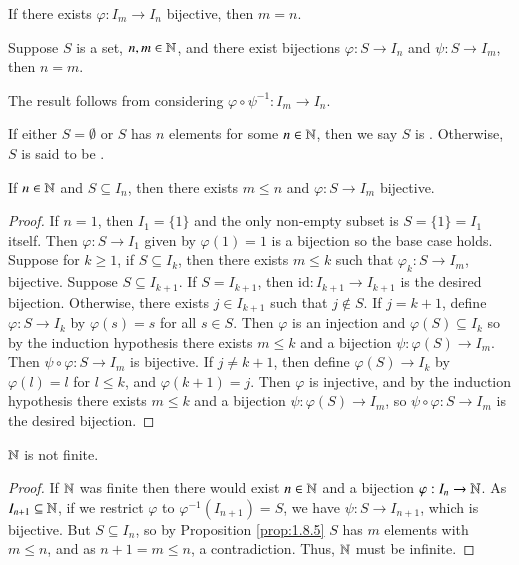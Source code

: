 \begin{subappendices}
    \begin{cor}\label{cor:1.8.3}
        If there exists $\varphi:I_m\rightarrow I_n$ bijective, then $m = n$.
    \end{cor}

    \begin{cor}\label{cor:1.8.4}
        Suppose $S$ is a set, $n,m \in \mathbb N$, and there exist bijections $\varphi:S\rightarrow I_n$ and $\psi:S\rightarrow I_m$, then $n = m$.
    \end{cor}

    The result follows from considering $\varphi\circ \psi^{-1}:I_m\rightarrow I_n$.

    \begin{defn}
        If either $S = \emptyset$ or $S$ has $n$ elements for some $n \in \mathbb N$, then we say $S$ is . Otherwise, $S$ is said to be .
    \end{defn}

    \begin{prop}\label{prop:1.8.5}
        If $n \in \mathbb N$ and $S \subseteq I_n$, then there exists $m \leq n$ and $\varphi:S\rightarrow I_m$ bijective.
    \end{prop}
    \begin{proof}
        If $n = 1$, then $I_1 = \{1\}$ and the only non-empty subset is $S = \{1\} = I_1$ itself. Then $\varphi:S\rightarrow I_1$ given by $\varphi(1) = 1$ is a bijection so the base case holds. Suppose for $k \geq 1$, if $S \subseteq I_k$, then there exists $m \leq k$ such that $\varphi_k:S\rightarrow I_m$, bijective. Suppose $S \subseteq I_{k+1}$. If $S = I_{k+1}$, then $\text{id}:I_{k+1}\rightarrow I_{k+1}$ is the desired bijection. Otherwise, there exists $j \in I_{k+1}$ such that $j \notin S$. If $j = k+1$, define $\varphi:S\rightarrow I_k$ by $\varphi(s) = s$ for all $s \in S$. Then $\varphi$ is an injection and $\varphi(S) \subseteq I_k$ so by the induction hypothesis there exists $m \leq k$ and a bijection $\psi:\varphi(S)\rightarrow I_m$. Then $\psi\circ \varphi:S\rightarrow I_m$ is bijective. If $j \neq k+1$, then define $\varphi(S)\rightarrow I_k$ by $\varphi(l) = l$ for $l \leq k$, and $\varphi(k+1) = j$. Then $\varphi$ is injective, and by the induction hypothesis there exists $m \leq k$ and a bijection $\psi:\varphi(S)\rightarrow I_m$, so $\psi\circ\varphi:S\rightarrow I_m$ is the desired bijection.
    \end{proof}

    \begin{prop}\label{prop:1.8.6}
        $\mathbb N$ is not finite.
    \end{prop}
    \begin{proof}
        If $\mathbb N$ was finite then there would exist $n \in \mathbb N$ and a bijection $\varphi:I_n\rightarrow \mathbb N$. As $I_{n+1} \subseteq \mathbb N$, if we restrict $\varphi$ to $\varphi^{-1}(I_{n+1}) = S$, we have $\psi:S\rightarrow I_{n+1}$, which is bijective. But $S\subseteq I_n$, so by Proposition \ref{prop:1.8.5} $S$ has $m$ elements with $m \leq n$, and as $n+1 = m \leq n$, a contradiction. Thus, $\mathbb N$ must be infinite.
    \end{proof}


\end{subappendices}
